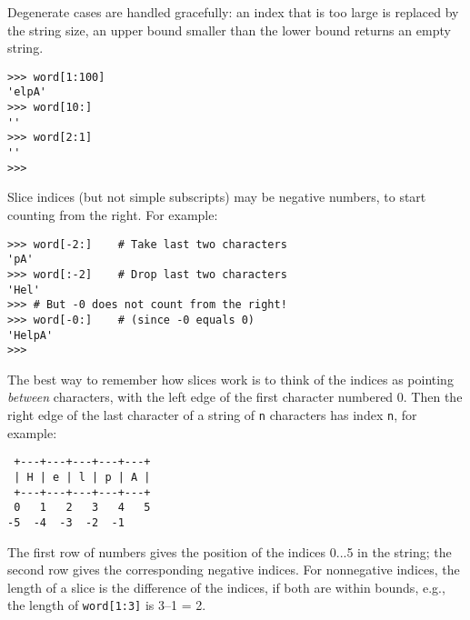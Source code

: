 Degenerate cases are handled gracefully: an index that is too large is
replaced by the string size, an upper bound smaller than the lower bound
returns an empty string.
\bcode\begin{verbatim}
>>> word[1:100]
'elpA'
>>> word[10:]
''
>>> word[2:1]
''
>>> 
\end{verbatim}\ecode
Slice indices (but not simple subscripts) may be negative numbers, to
start counting from the right.
For example:
\bcode\begin{verbatim}
>>> word[-2:]    # Take last two characters
'pA'
>>> word[:-2]    # Drop last two characters
'Hel'
>>> # But -0 does not count from the right!
>>> word[-0:]    # (since -0 equals 0)
'HelpA'
>>> 
\end{verbatim}\ecode
The best way to remember how slices work is to think of the indices as
pointing
{\em between}
characters, with the left edge of the first character numbered 0.
Then the right edge of the last character of a string of
{\tt n}
characters has index
{\tt n},
for example:
\bcode\begin{verbatim}
 +---+---+---+---+---+ 
 | H | e | l | p | A |
 +---+---+---+---+---+ 
 0   1   2   3   4   5 
-5  -4  -3  -2  -1
\end{verbatim}\ecode
The first row of numbers gives the position of the indices 0...5 in the
string; the second row gives the corresponding negative indices.
For nonnegative indices, the length of a slice is the difference of the
indices, if both are within bounds,
e.g.,
the length of
{\tt word[1:3]}
is 3--1 = 2.


